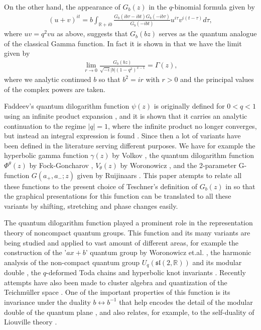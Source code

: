 \documentclass[10pt,reqno]{article}
\def\R{\mathbb{R}}
\def\to{\longrightarrow}
\def\G{\Gamma}
\def\c{\gamma}
\def\h{\theta}
\def\t{\tau}
\def\sl{\mathfrak{sl}}
\def\inv{^{-1}}
\newcommand{\Eq}[1]{\begin{align}#1\end{align}}
\numberwithin{equation}{section}
\begin{document}
On the other hand, the appearance of $G_b(z)$ in the $q$-binomial formula \cite{BT, Ip1} given by
\Eq{(u+v)^{it} = b\int_{\R+i0}\frac{G_b(ib\t-ibt)G_b(-ib\t)}{G_b(-ibt)}u^{i \t}v^{i (t-\t)} d\t,}
where $uv=q^2vu$ as above, suggests that $G_b(bz)$ serves as the quantum analogue of the classical Gamma function. In fact it is shown in \cite{Ip1} that we have the limit given by
\Eq{\label{Glim}\lim_{r\to 0} \frac{G_b(bz)}{\sqrt{-i}|b|  (1-q^2)^{x-1}} = \G(z),}
where we analytic continued $b$ so that $b^2=ir$ with $r>0$ and the principal values of the complex powers are taken.

Faddeev's quantum dilogarithm function $\psi(z)$ is originally defined for $0<q<1$ using an infinite product expansion \cite{Fa}, and it is shown that it carries an analytic continuation to the regime $|q|=1$, where the infinite product no longer converges, but instead an integral expression is found \cite{FKa}. Since then a lot of variants have been defined in the literature serving different purposes. We have for example the hyperbolic gamma function $\c(z)$ by Volkov \cite{Vo}, the quantum dilogarithm function $\Phi^\h(z)$ by Fock-Goncharov \cite{FG}, $V_\h(z)$ by Woronowicz \cite{WZ}, and the 2-parameter G-function $G(a_+,a_-;z)$ given by Ruijinaars \cite{Ru}. This paper atempts to relate all these functions to the present choice of Teschner's definition of $G_b(z)$ in \cite{BT} so that the graphical presentations for this function can be translated to all these variants by shifting, stretching and phase changes easily.

The quantum dilogarithm function played a prominent role in the representation theory of noncompact quantum groups. This function and its many variants are being studied \cite{Gon, KaN, Ru, Vo} and applied to vast amount of different areas, for example the construction of the '$ax+b$' quantum group by Woronowicz et.al. \cite{PuW, WZ}, the harmonic analysis of the non-compact quantum group $U_q(\sl(2,\R))$ and its modular double \cite{BT,PT1,PT2}, the $q$-deformed Toda chains \cite{KLS} and hyperbolic knot invariants \cite{Ka2}. Recently attempts have also been made to cluster algebra \cite{FG, KaN} and quantization of the Teichm\"{u}ller space \cite{CF, FK, Ka3}. One of the important properties of this function is its invariance under the duality $b\leftrightarrow b\inv$ that help encodes the detail of the modular double of the quantum plane \cite{Ip2}, and also relates, for example, to the self-duality of Liouville theory \cite{PT1}. 
\end{document}
